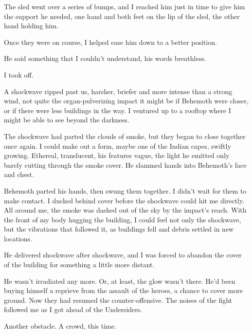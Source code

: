 The sled went over a series of bumps, and I reached him just in time to give him the support he needed, one hand and both feet on the lip of the sled, the other hand holding him.



Once they were on course, I helped ease him down to a better position.



He said something that I couldn't understand, his words breathless.



I took off.



A shockwave ripped past us, harsher, briefer and more intense than a strong wind, not quite the organ-pulverizing impact it might be if Behemoth were closer, or if there were less buildings in the way.  I ventured up to a rooftop where I might be able to see beyond the darkness.



The shockwave had parted the clouds of smoke, but they began to close together once again.  I could make out a form, maybe one of the Indian capes, swiftly growing.  Ethereal, translucent, his features vague, the light he emitted only barely cutting through the smoke cover.  He slammed hands into Behemoth's face and chest.



Behemoth parted his hands, then swung them together.  I didn't wait for them to make contact.  I ducked behind cover before the shockwave could hit me directly.  All around me, the smoke was dashed out of the sky by the impact's reach.  With the front of my body hugging the building, I could feel not only the shockwave, but the vibrations that followed it, as buildings fell and debris settled in new locations.



He delivered shockwave after shockwave, and I was forced to abandon the cover of the building for something a little more distant.



He wasn't irradiated any more.  Or, at least, the glow wasn't there.  He'd been buying himself a reprieve from the assault of the heroes, a chance to cover more ground.  Now they had resumed the counter-offensive.  The noises of the fight followed me as I got ahead of the Undersiders.



Another obstacle.  A crowd, this time.



